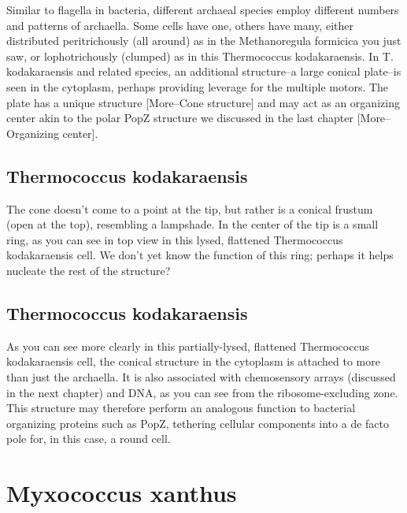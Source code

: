 \documentclass[]{tufte-book}
\begin{document}
Similar to flagella in bacteria, different archaeal species employ
different numbers and patterns of archaella. Some cells have one, others
have many, either distributed peritrichously (all around) as in the
Methanoregula formicica you just saw, or lophotrichously (clumped) as in
this Thermococcus kodakaraensis. In T. kodakaraensis and related
species, an additional structure--a large conical plate--is seen in the
cytoplasm, perhaps providing leverage for the multiple motors. The plate
has a unique structure {[}More--Cone structure{]} and may act as an
organizing center akin to the polar PopZ structure we discussed in the
last chapter {[}More--Organizing center{]}.

\subsection{Thermococcus kodakaraensis}\label{Cone_structure}

The cone doesn't come to a point at the tip, but rather is a conical
frustum (open at the top), resembling a lampshade. In the center of the
tip is a small ring, as you can see in top view in this lysed, flattened
Thermococcus kodakaraensis cell. We don't yet know the function of this
ring; perhaps it helps nucleate the rest of the structure?

\subsection{Thermococcus kodakaraensis}\label{Organizing_center}

As you can see more clearly in this partially-lysed, flattened
Thermococcus kodakaraensis cell, the conical structure in the cytoplasm
is attached to more than just the archaella. It is also associated with
chemosensory arrays (discussed in the next chapter) and DNA, as you can
see from the ribosome-excluding zone. This structure may therefore
perform an analogous function to bacterial organizing proteins such as
PopZ, tethering cellular components into a de facto pole for, in this
case, a round cell.

\section{Myxococcus xanthus}\label{myxococcus-xanthus}
\end{document}
